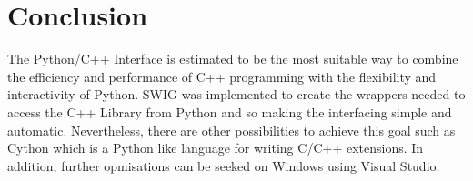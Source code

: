 \chapter{Conclusion}

The Python/C++ Interface is estimated to be the most suitable way to combine the efficiency and performance of C++ programming with the flexibility and interactivity of Python. SWIG was implemented to create the wrappers needed to access the C++ Library from Python and so making the interfacing simple and automatic. Nevertheless, there are other possibilities to achieve this goal such as Cython which is a Python like language for writing C/C++ extensions. In addition, further opmisations can be seeked on Windows using Visual Studio.
